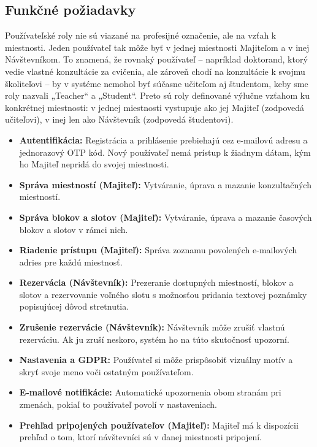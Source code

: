 \subsection{Funkčné požiadavky}
Používateľské roly nie sú viazané na profesijné označenie, ale na vzťah k miestnosti. Jeden používateľ tak môže byť v jednej miestnosti Majiteľom a v inej Návštevníkom. To znamená, že rovnaký používateľ – napríklad doktorand, ktorý vedie vlastné konzultácie za cvičenia, ale zároveň chodí na konzultácie k svojmu školiteľovi – by v systéme nemohol byť súčasne učiteľom aj študentom, keby sme roly nazvali „Teacher“ a „Student“. Preto sú roly definované výlučne vzťahom ku konkrétnej miestnosti: v jednej miestnosti vystupuje ako jej Majiteľ (zodpovedá učiteľovi), v inej len ako Návštevník (zodpovedá študentovi).
\begin{itemize}
\item \textbf{Autentifikácia:} Registrácia a prihlásenie prebiehajú cez e-mailovú adresu a jednorazový OTP kód. Nový používateľ nemá prístup k žiadnym dátam, kým ho Majiteľ nepridá do svojej miestnosti.
\item \textbf{Správa miestností (Majiteľ):} Vytváranie, úprava a mazanie konzultačných miestností.
\item \textbf{Správa blokov a slotov (Majiteľ):} Vytváranie, úprava a mazanie časových blokov a slotov v rámci nich.
\item \textbf{Riadenie prístupu (Majiteľ):} Správa zoznamu povolených e-mailových adries pre každú miestnosť.
\item \textbf{Rezervácia (Návštevník):} Prezeranie dostupných miestností, blokov a slotov a rezervovanie voľného slotu s možnosťou pridania textovej poznámky popisujúcej dôvod stretnutia.
\item \textbf{Zrušenie rezervácie (Návštevník):} Návštevník môže zrušiť vlastnú rezerváciu. Ak ju zruší neskoro, systém ho na túto skutočnosť upozorní.
\item \textbf{Nastavenia a GDPR:} Používateľ si môže prispôsobiť vizuálny motív a skryť svoje meno voči ostatným používateľom.
\item \textbf{E-mailové notifikácie:} Automatické upozornenia obom stranám pri zmenách, pokiaľ to používateľ povolí v nastaveniach.
\item \textbf{Prehľad pripojených používateľov (Majiteľ):} 
Majiteľ má k dispozícii prehľad o tom, ktorí 
návštevníci sú v danej miestnosti pripojení.
\end{itemize}

